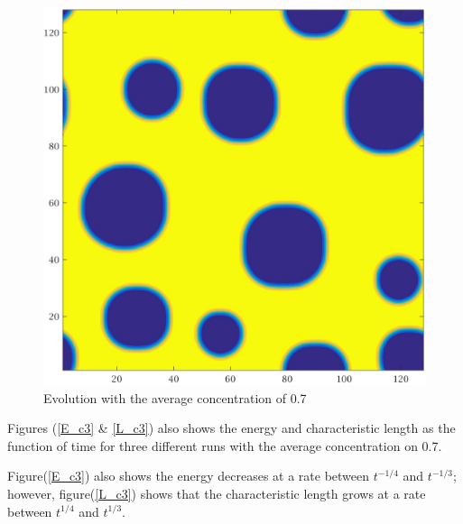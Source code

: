 \documentclass[a4paper,6pt]{article}
\begin{document}
\begin{figure}[H]
\begin{minipage}[b]{.32\linewidth}
        \end{minipage}
                \begin{minipage}[b]{.32\linewidth}
                \centering
                \includegraphics[width=1\textwidth]{pics/C3_t6.jpg}
        \end{minipage}
        \caption{Evolution with the average concentration of 0.7}
        \label{evolution_c3}
\end{figure}

Figures (\ref{E_c3} \& \ref{L_c3}) also shows the energy and characteristic length as the function of time for three different runs with the average concentration on 0.7.

Figure(\ref{E_c3}) also shows the energy decreases at a rate between $t^{-1/4}$ and $t^{-1/3}$; however, figure(\ref{L_c3}) shows that the characteristic length grows at a rate between $t^{1/4}$ and $t^{1/3}$.
\end{document}
